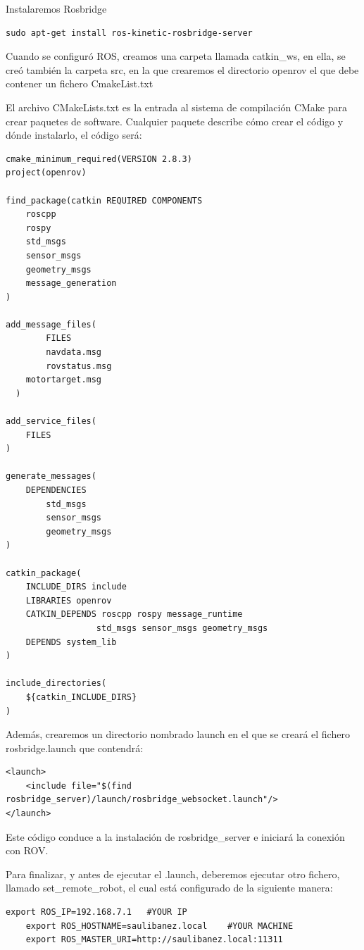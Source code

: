 Instalaremos Rosbridge
\begin{lstlisting}[caption=Rosbridge, label={lst:rosbridge}]
sudo apt-get install ros-kinetic-rosbridge-server
\end{lstlisting}

Cuando se configuró ROS, creamos una carpeta llamada catkin\_ws, en ella, se creó también la carpeta src, en la que crearemos el directorio openrov el que debe contener un fichero CmakeList.txt

El archivo CMakeLists.txt es la entrada al sistema de compilación CMake para crear paquetes de software. Cualquier paquete describe cómo crear el código y dónde instalarlo, el código será:

\begin{lstlisting}[caption=CMakeList.txt, label={lst:cmakelist}]
cmake_minimum_required(VERSION 2.8.3)
project(openrov)

find_package(catkin REQUIRED COMPONENTS
  	roscpp
  	rospy
  	std_msgs
 	sensor_msgs
  	geometry_msgs
  	message_generation
)

add_message_files(
    	FILES
    	navdata.msg
    	rovstatus.msg
   	motortarget.msg
  )

add_service_files(
    FILES
)

generate_messages(
	DEPENDENCIES
    	std_msgs
    	sensor_msgs
    	geometry_msgs
)

catkin_package(
   	INCLUDE_DIRS include
   	LIBRARIES openrov
   	CATKIN_DEPENDS roscpp rospy message_runtime
                  std_msgs sensor_msgs geometry_msgs
   	DEPENDS system_lib
)

include_directories(
  	${catkin_INCLUDE_DIRS}
)
\end{lstlisting}


Además, crearemos un directorio nombrado launch en el que se creará el fichero rosbridge.launch que contendrá:

\begin{lstlisting}[caption=websocket.launch, label={lst:launch}]
<launch>
 	<include file="$(find rosbridge_server)/launch/rosbridge_websocket.launch"/>
</launch>
\end{lstlisting}

Este código conduce a la instalación de rosbridge\_server e iniciará la conexión con ROV.

Para finalizar, y antes de ejecutar el .launch, deberemos ejecutar otro fichero, llamado set\_remote\_robot, el cual está configurado de la siguiente manera:
\begin{lstlisting}[caption=set\_remote\_robot, label={lst:remote}]
	export ROS_IP=192.168.7.1 	#YOUR IP
	export ROS_HOSTNAME=saulibanez.local 	#YOUR MACHINE
	export ROS_MASTER_URI=http://saulibanez.local:11311
\end{lstlisting}

